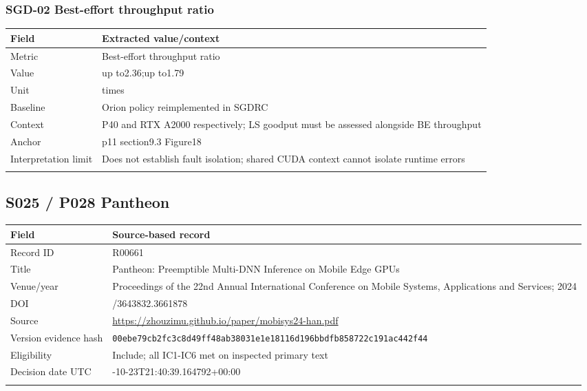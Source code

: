 \subsubsection*{SGD-02 Best-effort throughput ratio}
\begin{longtable}{>{\raggedright\arraybackslash}p{}>{\raggedright\arraybackslash}p{}}
\toprule
\textbf{Field} & \textbf{Extracted value/context}\\\midrule\endhead
Metric & Best-effort throughput ratio\\\addlinespace
Value & up to2.36;\allowbreak{}up to1.79\\\addlinespace
Unit & times\\\addlinespace
Baseline & Orion policy reimplemented in SGDRC\\\addlinespace
Context & P40 and RTX A2000 respectively;\allowbreak{} LS goodput must be assessed alongside BE throughput\\\addlinespace
Anchor & p11 section9.3 Figure18\\\addlinespace
Interpretation limit & Does not establish fault isolation;\allowbreak{} shared CUDA context cannot isolate runtime errors\\\addlinespace
\bottomrule\end{longtable}
\clearpage\subsection{S025 / P028 Pantheon}
\cite{s025}
\begin{longtable}{>{\raggedright\arraybackslash}p{}>{\raggedright\arraybackslash}p{}}
\toprule
\textbf{Field} & \textbf{Source-based record}\\\midrule\endhead
Record ID & R00661\\\addlinespace
Title & Pantheon: Preemptible Multi-DNN Inference on Mobile Edge GPUs\\\addlinespace
Venue/year & Proceedings of the 22nd Annual International Conference on Mobile Systems,\allowbreak{} Applications and Services;\allowbreak{} 2024\\\addlinespace
DOI & 10.1145/3643832.3661878\\\addlinespace
Source & \url{https://zhouzimu.github.io/paper/mobisys24-han.pdf}\\\addlinespace
Version evidence hash & \nolinkurl{00ebe79cb2fc3c8d49ff48ab38031e1e18116d196bbdfb858722c191ac442f44}\\\addlinespace
Eligibility & Include;\allowbreak{} all IC1-IC6 met on inspected primary text\\\addlinespace
Decision date UTC & 2026-10-23T21:40:39.164792+00:00\\\addlinespace
\bottomrule\end{longtable}
